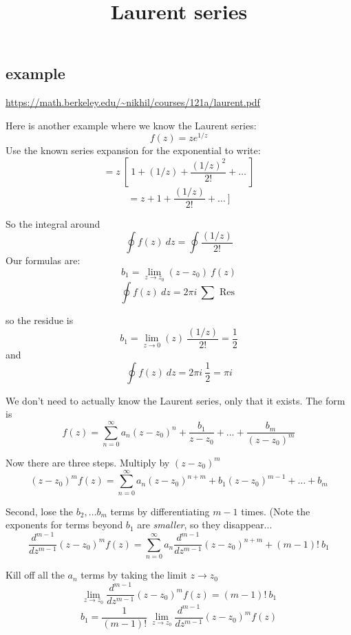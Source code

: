 \documentclass[11pt, oneside]{article}
\title{Laurent series}
\date{}
\begin{document}
\maketitle
\Large 

\subsection*{example}
\url{https://math.berkeley.edu/~nikhil/courses/121a/laurent.pdf}

Here is another example where we know the Laurent series:
\[ f(z) = z e^{1/z} \]
Use the known series expansion for the exponential to write:
\[ = z \ [ \ 1 + (1/z) + \frac{(1/z)^2}{2!} + \dots \ ] \]
\[ = z + 1 + \frac{(1/z)}{2!} + \dots \ ] \]

So the integral around 
\[ \oint f(z) \ dz = \oint \frac{(1/z)}{2!} \]
Our formulas are:
\[ b_1 = \lim_{z \rightarrow z_0} (z-z_0) \ f(z)  \]
\[ \oint f(z) \ dz = 2 \pi i \ \sum \text{ Res } \]

so the residue is
\[ b_1 = \lim_{z \rightarrow 0} (z) \ \frac{(1/z)}{2!} = \frac{1}{2} \]
and
\[ \oint f(z) \ dz = 2 \pi i \ \frac{1}{2} = \pi i \]

We don't need to actually know the Laurent series, only that it exists.  The form is
\[ f(z) = \sum_{n=0}^{\infty} a_n(z-z_0)^n + \frac{b_1}{z-z_0} + \dots + \frac{b_m}{(z-z_0)^m} \]

Now there are three steps.  Multiply by $(z - z_0)^m$
\[ (z - z_0)^m f(z) = \sum_{n=0}^{\infty} a_n(z-z_0)^{n+m} + b_1 (z-z_0)^{m-1} + \dots + b_m \]

Second, lose the $b_2, \dots b_m$ terms by differentiating $m-1$ times.  (Note the exponents for terms beyond $b_1$ are \emph{smaller}, so they disappear...
\[ \frac{d^{m-1}}{dz^{m-1}} (z-z_0)^m f(z) = \sum_{n=0}^{\infty} a_n\frac{d^{m-1}}{dz^{m-1}}  (z-z_0)^{n+m} + (m-1)! \ b_1 \]

Kill off all the $a_n$ terms by taking the limit $z \rightarrow z_0$
\[ \lim_{z \rightarrow z_0}  \frac{d^{m-1}}{dz^{m-1}} (z-z_0)^m f(z) = (m-1)! \ b_1 \]
\[ b_1 = \frac{1}{(m-1)!} \ \lim_{z \rightarrow z_0}  \frac{d^{m-1}}{dz^{m-1}} (z-z_0)^m f(z) \]
\end{document}

